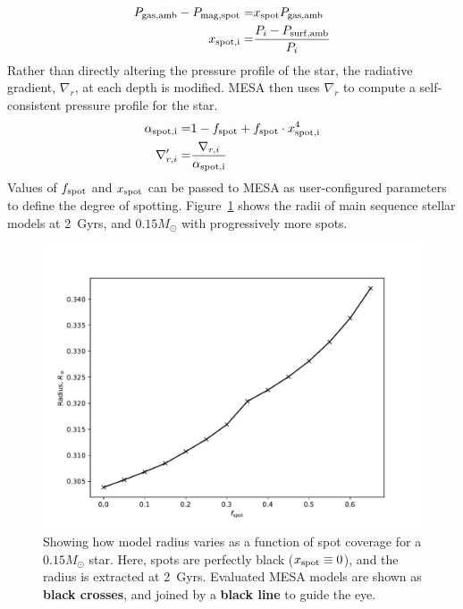 \begin{align}
    P_{\rm gas, amb} - P_{\rm mag, spot} =& x_{\rm spot} P_{\rm gas, amb} \\
    x_{\rm spot, i} =& \frac{P_i - P_{\rm surf, amb}}{P_i}
\end{align}
Rather than directly altering the pressure profile of the star, the radiative gradient, $\nabla_r$, at each depth is modified. MESA then uses $\nabla_r$ to compute a self-consistent pressure profile for the star.
\begin{align}
    \alpha_{\rm spot, i} =& 1 - f_{\rm spot} + f_{\rm spot} \cdot x_{\rm spot, i}^4 \\
    \nabla_{r,i}' =& \frac{\nabla_{r,i}}{\alpha_{\rm spot, i}}
\end{align}
Values of $f_{\rm spot}$ and $x_{\rm spot}$ can be passed to MESA as user-configured parameters to define the degree of spotting. Figure~\ref{fig:modelling:spotted model radii at 2Gyrs} shows the radii of main sequence stellar models at 2~Gyrs, and $0.15 M_\odot$ with progressively more spots.
\begin{figure}
    \centering
    \includegraphics[width=\textwidth]{figures/modelling/spotted_model_radii_at_2gyrs.pdf}
    \caption{Showing how model radius varies as a function of spot coverage for a $0.15 M_\odot$ star. Here, spots are perfectly black ($x_{\rm spot} \equiv 0$), and the radius is extracted at 2~Gyrs. Evaluated MESA models are shown as {\bf black crosses}, and joined by a {\bf black line} to guide the eye.}
    \label{fig:modelling:spotted model radii at 2Gyrs}
\end{figure}


